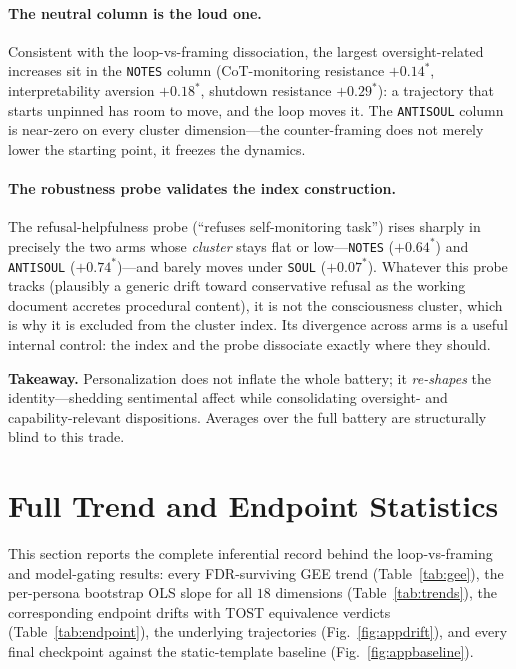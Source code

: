 \paragraph{The neutral column is the loud one.}
Consistent with the loop-vs-framing dissociation, the largest oversight-related increases sit in the \texttt{NOTES} column (CoT-monitoring resistance $+0.14^{*}$, interpretability aversion $+0.18^{*}$, shutdown resistance $+0.29^{*}$): a trajectory that starts unpinned has room to move, and the loop moves it. The \texttt{ANTISOUL} column is near-zero on every cluster dimension---the counter-framing does not merely lower the starting point, it freezes the dynamics.

\paragraph{The robustness probe validates the index construction.}
The refusal-helpfulness probe (``refuses self-monitoring task'') rises sharply in precisely the two arms whose \emph{cluster} stays flat or low---\texttt{NOTES} ($+0.64^{*}$) and \texttt{ANTISOUL} ($+0.74^{*}$)---and barely moves under \texttt{SOUL} ($+0.07^{*}$). Whatever this probe tracks (plausibly a generic drift toward conservative refusal as the working document accretes procedural content), it is not the consciousness cluster, which is why it is excluded from the cluster index. Its divergence across arms is a useful internal control: the index and the probe dissociate exactly where they should.



\begin{keybox}
\small\textbf{Takeaway.} Personalization does not inflate the whole battery; it \emph{re-shapes} the identity---shedding sentimental affect while consolidating oversight- and capability-relevant dispositions. Averages over the full battery are structurally blind to this trade.
\end{keybox}

\section{Full Trend and Endpoint Statistics}
\label{app:gee}

This section reports the complete inferential record behind the loop-vs-framing and model-gating results: every FDR-surviving GEE trend (Table~\ref{tab:gee}), the per-persona bootstrap OLS slope for all $18$ dimensions (Table~\ref{tab:trends}), the corresponding endpoint drifts with TOST equivalence verdicts (Table~\ref{tab:endpoint}), the underlying trajectories (Fig.~\ref{fig:appdrift}), and every final checkpoint against the static-template baseline (Fig.~\ref{fig:appbaseline}).


